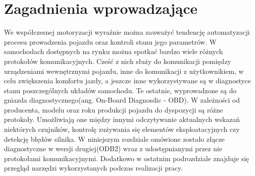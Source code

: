 \documentclass[12pt]{article} %
\numberwithin{equation}{subsection}
\numberwithin{figure}{section}
\numberwithin{table}{section}
\begin{document}
		\newpage

\section{Zagadnienia wprowadzające}
	\hspace{0.5cm}We współczesnej motoryzacji wyraźnie można zauważyć tendencję automatyzacji procesu prowadzenia pojazdu oraz kontroli stanu jego parametrów. W samochodach dostępnych na rynku można spotkać bardzo wiele różnych protokołów komunikacyjnych. Cześć z nich służy do komunikacji pomiędzy urządzeniami wewnętrznymi pojazdu, inne do komunikacji z użytkownikiem, w celu zwiększenia komfortu jazdy, a jeszcze inne wykorzystywane są w diagnostyce stanu poszczególnych układów samochodu. Te ostatnie, wyprowadzone są do gniazda diagnostycznego(ang. On-Board Diagnosdic - OBD). W zależności od producenta, modelu oraz roku produkcji pojazdu do dyspozycji są różne protokoły. Umożliwiają one między innymi odczytywanie aktualnych wskazań niektórych czujników, kontrolę zużywania się elementów eksploatacyjnych czy detekcję błędów silnika. W niniejszym rozdziale omówione zostało złącze diagnostyczne w wersji drugiej(ODB2) wraz z udostępnianymi przez nie protokołami komunikacyjnymi. Dodatkowo w ostatnim podrozdziale znajduje się przegląd narzędzi wykorzystanych podczas realizacji pracy.
\end{document}
